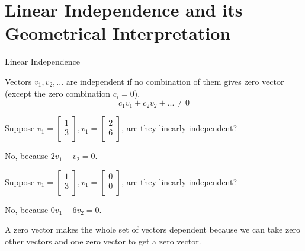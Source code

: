 \documentclass{beamer}
\begin{document}
\section{Linear Independence and its Geometrical Interpretation}
\begin{frame}{Linear Independence}
\begin{theorem}
Vectors $v_1, v_2, ...$ are independent if no combination of them gives zero vector (except the zero combination $c_i=0$).
\vspace{-8pt}
\begin{equation*}
    c_1v_1+c_2v_2+...\ne0
\end{equation*}
\end{theorem}

Suppose $v_1=\left[ \begin{array}{c}
	1\\
	3\\
\end{array} \right], v_1=\left[ \begin{array}{c}
	2\\
	6\\
\end{array} \right]$, are they linearly independent?

No, because $2v_1-v_2=0$.

\vspace{5pt}
Suppose $v_1=\left[ \begin{array}{c}
	1\\
	3\\
\end{array} \right], v_1=\left[ \begin{array}{c}
	0\\
	0\\
\end{array} \right]$, are they linearly independent?

No, because $0v_1-6v_2=0$.

\vspace{3pt} A zero vector makes the whole set of vectors dependent because we can take zero other vectors and one zero vector to get a zero vector.
\end{frame}
\end{document}
